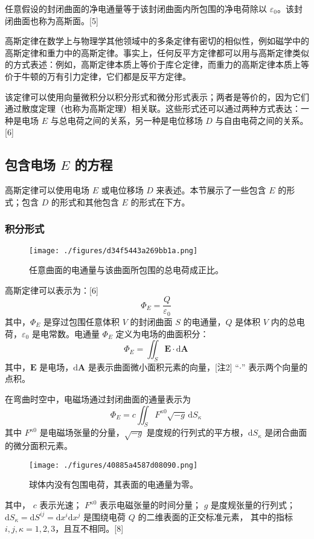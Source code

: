 任意假设的封闭曲面的净电通量等于该封闭曲面内所包围的净电荷除以 \(\varepsilon_0\)。该封闭曲面也称为高斯面。[5]

高斯定律在数学上与物理学其他领域中的多条定律有密切的相似性，例如磁学中的高斯定律和重力中的高斯定律。事实上，任何反平方定律都可以用与高斯定律类似的方式表述：例如，高斯定律本质上等价于库仑定律，而重力的高斯定律本质上等价于牛顿的万有引力定律，它们都是反平方定律。

该定律可以使用向量微积分以积分形式和微分形式表示；两者是等价的，因为它们通过散度定理（也称为高斯定理）相关联。这些形式还可以通过两种方式表达：一种是电场 \( E \) 与总电荷之间的关系，另一种是电位移场 \( D \) 与自由电荷之间的关系。[6]
\subsection{包含电场 \( E \) 的方程}
高斯定律可以使用电场 \( E \) 或电位移场 \( D \) 来表述。本节展示了一些包含 \( E \) 的形式；包含 \( D \) 的形式和其他包含 \( E \) 的形式在下方。
\subsubsection{积分形式}
\begin{figure}[ht]
\centering
\texttt{[image: ./figures/d34f5443a269bb1a.png]}
\caption{任意曲面的电通量与该曲面所包围的总电荷成正比。} \label{fig_GSDL_2}
\end{figure}
高斯定律可以表示为：[6]
\[
\Phi_{E} = \frac{Q}{\varepsilon_{0}}~
\]
其中，\(\Phi_{E}\) 是穿过包围任意体积 \(V\) 的封闭曲面 \(S\) 的电通量，\(Q\) 是体积 \(V\) 内的总电荷，\(\varepsilon_{0}\) 是电常数。电通量 \(\Phi_{E}\) 定义为电场的曲面积分：
\[
\Phi_{E} = \iint_{S} \mathbf{E} \cdot \mathrm{d} \mathbf{A}~
\]
其中，\(\mathbf{E}\) 是电场，\(\mathrm{d} \mathbf{A}\) 是表示曲面微小面积元素的向量，[注2] “\(\cdot\)” 表示两个向量的点积。

在弯曲时空中，电磁场通过封闭曲面的通量表示为
\[
\Phi_{E} = c\iint_{S} F^{\kappa 0} \sqrt{-g} \, \mathrm{d} S_{\kappa}~
\]
其中 \(F^{\kappa 0}\) 是电磁场张量的分量，\(\sqrt{-g}\) 是度规的行列式的平方根，\(\mathrm{d} S_{\kappa}\) 是闭合曲面的微分面积元素。
\begin{figure}[ht]
\centering
\texttt{[image: ./figures/40885a4587d08090.png]}
\caption{球体内没有包围电荷，其表面的电通量为零。} \label{fig_GSDL_3}
\end{figure}
其中，  
\( c \) 表示光速；  
\( F^{\kappa 0} \) 表示电磁张量的时间分量；  
\( g \) 是度规张量的行列式；  
\(\mathrm{d} S_{\kappa} = \mathrm{d} S^{ij} = \mathrm{d} x^{i} \mathrm{d} x^{j}\) 是围绕电荷 \( Q \) 的二维表面的正交标准元素，  
其中的指标 \( i, j, \kappa = 1, 2, 3 \)，且互不相同。[8]

